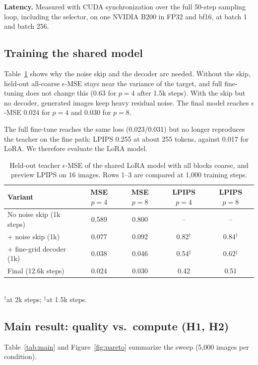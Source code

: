 \textbf{Latency.} Measured with CUDA synchronization over the full 50-step sampling loop, including the selector, on one NVIDIA B200 in
FP32 and bf16, at batch 1 and batch 256.

\subsection{Training the shared model}
\label{sec:training-results}
Table~\ref{tab:ablation} shows why the noise skip and the decoder are needed. Without the skip, held-out all-coarse $\epsilon$-MSE stays
near the variance of the target, and full fine-tuning does not change this (0.63 for $p{=}4$ after 1.5k steps). With the skip but no
decoder, generated images keep heavy residual noise. The final model reaches $\epsilon$-MSE 0.024 for $p{=}4$ and 0.030 for $p{=}8$.

The full fine-tune reaches the same loss (0.023/0.031) but no longer reproduces the teacher on the fine path: LPIPS 0.255 at about 255
tokens, against 0.017 for LoRA. We therefore evaluate the LoRA model.

\begin{table}[t]
\centering
\small
\caption{Held-out teacher $\epsilon$-MSE of the shared LoRA model with all blocks coarse, and preview LPIPS on 16 images.
Rows 1--3 are compared at 1,000 training steps.}
\label{tab:ablation}
\begin{tabular}{lcccc}
\toprule
Variant & MSE $p{=}4$ & MSE $p{=}8$ & LPIPS $p{=}4$ & LPIPS $p{=}8$ \\
\midrule
No noise skip (1k steps) & 0.589 & 0.800 & -- & -- \\
+ noise skip (1k) & 0.077 & 0.092 & 0.82$^\dagger$ & 0.84$^\dagger$ \\
+ fine-grid decoder (1k) & 0.038 & 0.046 & 0.54$^\ddagger$ & 0.62$^\ddagger$ \\
Final (12.6k steps) & 0.024 & 0.030 & 0.42 & 0.51 \\
\bottomrule
\end{tabular}\\[2pt]
{\footnotesize $^\dagger$at 2k steps; $^\ddagger$at 1.5k steps.}
\end{table}

\subsection{Main result: quality vs.\ compute (H1, H2)}
\label{sec:main-results}
Table~\ref{tab:main} and Figure~\ref{fig:pareto} summarize the sweep (5,000 images per condition).

